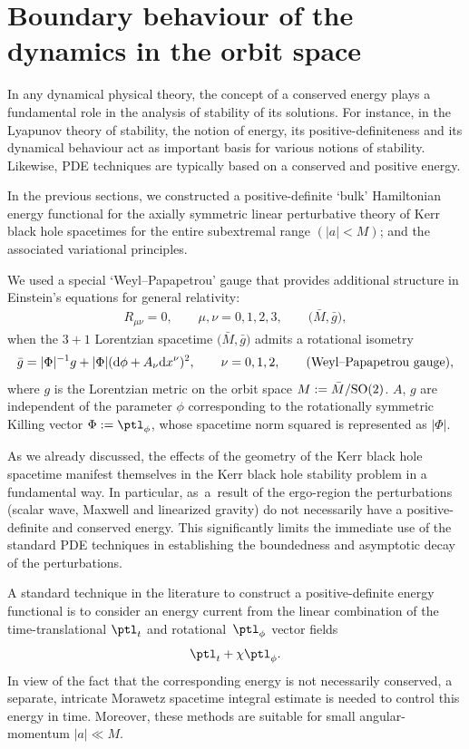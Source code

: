 \section{Boundary behaviour of the dynamics in the orbit space}\label{section5}

In any dynamical physical theory, the concept of a conserved energy plays a fundamental role in the analysis of stability of its solutions. For instance, in the Lyapunov theory of stability, the notion of energy,
its positive-definiteness and its dynamical behaviour act as important basis for various notions of stability. Likewise, PDE techniques are typically based on a conserved and positive energy.

In the previous sections, we constructed a positive-definite `bulk' Hamiltonian energy functional for the axially symmetric linear perturbative theory of Kerr black hole spacetimes for the entire subextremal range $(\vert a \vert<M)$; and the associated variational principles.

We used a special `Weyl--Papapetrou' gauge that provides additional structure in Einstein's equations for general relativity:
\begin{align*}
R_{\mu \nu} =0, \qquad \mu, \nu=0, 1,2, 3, \qquad \bigl(\bar{M}, \bar{g}\bigr),
\end{align*}
when the $3+1$ Lorentzian spacetime $\bigl(\bar{M}, \bar{g}\bigr)$ admits a rotational isometry
\begin{align} \label{WP-gauge}
\bar{g} = \vert \Phi \vert^{-1} g + \vert \Phi \vert ({\rm d}\phi + A_\nu {\rm d}x^\nu)^2, \qquad \nu = 0,1, 2, \qquad \text{(Weyl--Papapetrou gauge)},
\end{align}
where $g$ is the Lorentzian metric on the orbit space $M := \bar{M}/{\rm SO}(2)$. $A$, $g$ are independent of the parameter $\phi$ corresponding to the rotationally symmetric Killing vector $\Phi :=\ptl_\phi$, whose spacetime norm squared is represented as $\vert \Phi \vert$.

As we already discussed, the effects of the geometry of the Kerr black hole spacetime manifest themselves in the Kerr black hole stability problem in a fundamental way. In particular, as~a~result of the ergo-region the perturbations (scalar wave, Maxwell and linearized gravity) do not necessarily have a positive-definite and conserved energy. This significantly limits the immediate use of the standard PDE techniques in establishing the boundedness and asymptotic decay of the perturbations.

A standard technique in the literature to construct a positive-definite energy functional is to consider an energy current from the linear combination of the time-translational $\ptl_t$ and rotational~$\ptl_\phi$ vector fields
\begin{align*}
\ptl_ t + \chi \ptl_\phi.
\end{align*}
 In view of the fact that the corresponding energy is not necessarily conserved, a separate, intricate Morawetz spacetime integral estimate is needed to control this energy in time. Moreover, these methods are suitable for small angular-momentum $\vert a \vert \ll M$.

